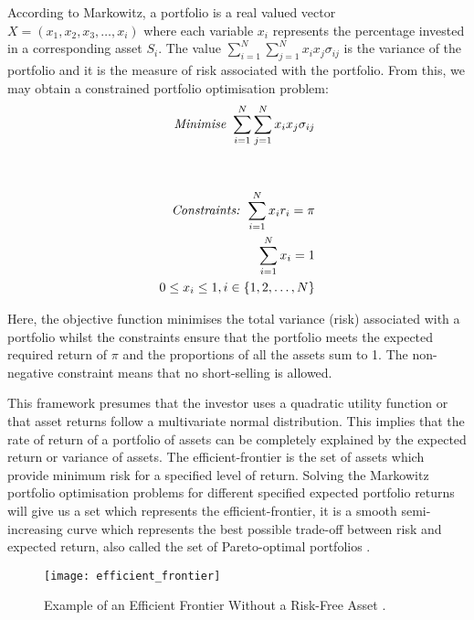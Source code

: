     According to Markowitz, a portfolio is a real valued vector $X = (x_1,x_2,x_3, \dots ,x_i)$ where each variable $x_i$ represents the percentage invested in a corresponding asset $S_i$. The value $\sum\limits_{i=1}^N \sum\limits_{j=1}^N x_i x_j \sigma_{ij}$ is the variance of the portfolio and it is the measure of risk associated with the portfolio. From this, we may obtain a constrained portfolio optimisation problem: 
    \begin{equation}
      \begin{split}
        \mbox{\textit{Minimise  }} \sum\limits_{i=1}^N \sum\limits_{j=1}^N x_i x_j \sigma_{ij} \\
        \\\\
        \mbox{\textit{Constraints:} }
        \sum\limits_{i=1}^N x_i r_i = \pi \\
        \sum\limits_{i=1}^N x_i = 1 \\
        0 \leq x_i \leq 1, i \in \{1,2,\dots,N\}
      \end{split}
    \end{equation}

    Here, the objective function minimises the total variance (risk) associated with a portfolio whilst the constraints ensure that the portfolio meets the expected required return of $\pi$ and the proportions of all the assets sum to 1. The non-negative constraint means that no short-selling is allowed. 

    This framework presumes that the investor uses a quadratic utility function or that asset returns follow a multivariate normal distribution. This implies that the rate of return of a portfolio of assets can be completely explained by the expected return or variance of assets. The efficient-frontier is the set of assets which provide minimum risk for a specified level of return. Solving the Markowitz portfolio optimisation problems for different specified expected portfolio returns will give us a set which represents the efficient-frontier, it is a smooth semi-increasing curve which represents the best possible trade-off between risk and expected return, also called the set of Pareto-optimal portfolios \cite{pareto}. 

    \begin{figure}[H]
      \centering
        \texttt{[image: efficient\_frontier]}
      \caption{Example of an Efficient Frontier Without a Risk-Free Asset \cite{efficient_frontier}.}
      \label{efficient_frontier}
    \end{figure}

